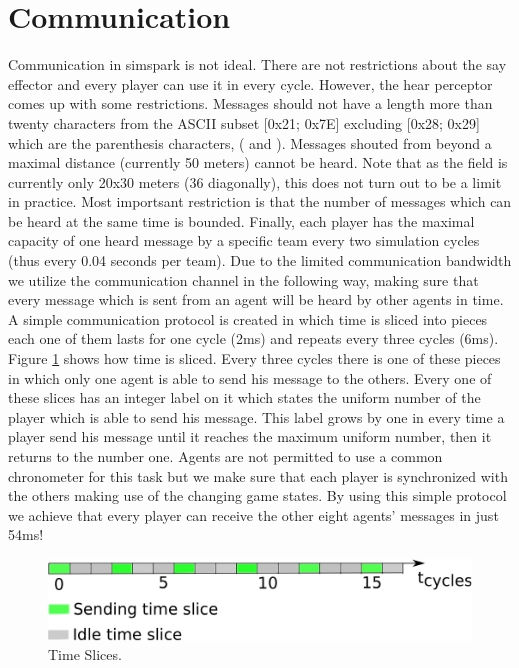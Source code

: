 \section{Communication}
Communication in simspark is not ideal. There are not restrictions about the say effector and every player can use it in every cycle. However, the hear perceptor comes up with some restrictions. Messages should not have a length more than twenty characters from the ASCII subset [0x21; 0x7E] excluding [0x28; 0x29] which are the parenthesis characters, ( and ). Messages shouted from beyond a maximal distance (currently 50 meters) cannot be heard. Note that as the field is currently only 20x30 meters (36 diagonally), this does not turn out to be a limit in practice. Most importsant restriction is that the number of messages which can be heard at the same time is bounded. Finally, each player has the maximal capacity of one heard message by a specific team every two simulation cycles (thus every 0.04 seconds per team). Due to the limited communication bandwidth we utilize the communication channel in the following way, making sure that every message which is sent from an agent will be heard by other agents in time. A simple communication protocol is created in which time is sliced into pieces each one of them lasts for one cycle (2ms) and repeats every three cycles (6ms). Figure \ref{fig:TimeSlicing} shows how time is sliced. Every three cycles there is one of these pieces in which only one agent is able to send his message to the others. Every one of these slices has an integer label on it which states the uniform number of the player which is able to send his message. This label grows by one in every time a player send his message until it reaches the maximum uniform number, then it returns to the number one. Agents are not permitted to use a common chronometer for this task but we make sure that each player is synchronized with the others making use of the changing game states. By using this simple protocol we achieve that every player can receive the other eight agents' messages in just 54ms!
\begin{figure}[!h]
\centering
  \includegraphics[scale=0.7]{Chapter3/figures/MAC.pdf}  \caption{Time Slices.}
  \label{fig:TimeSlicing}
\end{figure} 